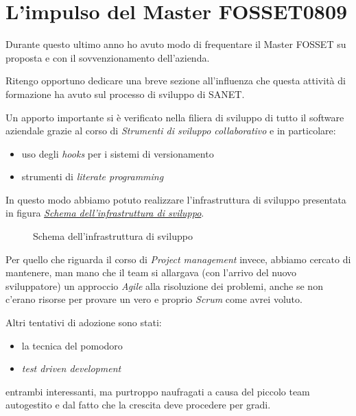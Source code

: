 \documentclass[a4wide,10pt,italian]{manual}
\begin{document}
\section{L'impulso del Master FOSSET0809}

Durante questo ultimo anno ho avuto modo di frequentare il Master FOSSET
su proposta e con il sovvenzionamento dell'azienda.

Ritengo opportuno dedicare una breve sezione all'influenza che questa attività
di formazione ha avuto sul processo di sviluppo di SANET.

Un apporto importante si è verificato nella filiera di sviluppo di
tutto il software aziendale grazie al corso di \emph{Strumenti di sviluppo collaborativo}
e in particolare:
\begin{itemize}
\item {} 
uso degli \emph{hooks} per i sistemi di versionamento

\item {} 
strumenti di \emph{literate programming}

\end{itemize}

In questo modo abbiamo potuto realizzare l'infrastruttura di sviluppo presentata
in figura \hyperlink{dev-infrastructure}{\emph{Schema dell'infrastruttura di sviluppo}}.
\hypertarget{dev-infrastructure}{}\begin{figure}[htbp]
\centering

\caption{Schema dell'infrastruttura di sviluppo}\end{figure}

Per quello che riguarda il corso di \emph{Project management} invece, abbiamo cercato di mantenere,
man mano che il team si allargava (con l'arrivo del nuovo sviluppatore) un approccio \emph{Agile} alla risoluzione
dei problemi, anche se non c'erano risorse per provare un vero e proprio \emph{Scrum} come avrei voluto.

Altri tentativi di adozione sono stati:
\begin{itemize}
\item {} 
la tecnica del pomodoro

\item {} 
\emph{test driven development}

\end{itemize}

entrambi interessanti, ma purtroppo naufragati a causa del piccolo team autogestito
e dal fatto che la crescita deve procedere per gradi.
\end{document}
